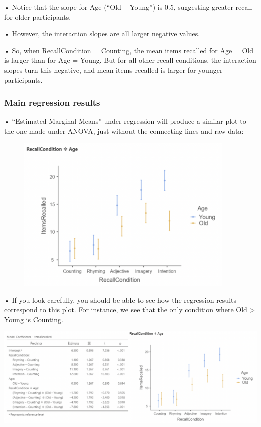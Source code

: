 \documentclass[
  letterpaper,
  DIV=11,
  numbers=noendperiod]{scrreprt}
\begin{document}
• Notice that the slope for Age (``Old -- Young'') is 0.5, suggesting
greater recall for older participants.

• However, the interaction slopes are all larger negative values.

• So, when RecallCondition = Counting, the mean items recalled for Age =
Old is larger than for Age = Young. But for all other recall conditions,
the interaction slopes turn this negative, and mean items recalled is
larger for younger participants.

\hypertarget{main-regression-results}{%
\subsubsection{Main regression results}\label{main-regression-results}}

• ``Estimated Marginal Means'' under regression will produce a similar
plot to the one made under ANOVA, just without the connecting lines and
raw data:

\begin{figure}

{\centering \includegraphics[width=4.11458in,height=\textheight]{images/Mod5_15.png}

}

\end{figure}

• If you look carefully, you should be able to see how the regression
results correspond to this plot. For instance, we see that the only
condition where Old \textgreater{} Young is Counting.

\includegraphics{images/Mod5_16.png}
\end{document}
